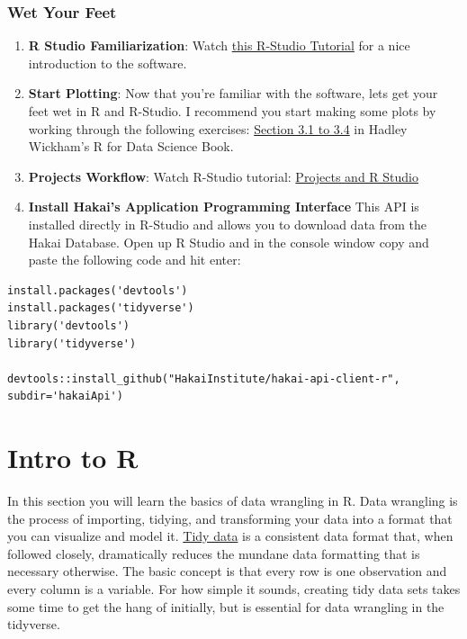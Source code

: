 \documentclass[]{book}
\begin{document}
\subsection{Wet Your Feet}\label{wet-your-feet}

\begin{enumerate}
\def\labelenumi{\arabic{enumi})}
\item
  \textbf{R Studio Familiarization}: Watch
  \href{https://www.rstudio.com/resources/webinars/rstudio-essentials-webinar-series-part-1/}{this
  R-Studio Tutorial} for a nice introduction to the software.
\item
  \textbf{Start Plotting}: Now that you're familiar with the software,
  lets get your feet wet in R and R-Studio. I recommend you start making
  some plots by working through the following exercises:
  \href{http://r4ds.had.co.nz/data-visualisation.html}{Section 3.1 to
  3.4} in Hadley Wickham's R for Data Science Book.
\item
  \textbf{Projects Workflow}: Watch R-Studio tutorial:
  \href{https://www.rstudio.com/resources/webinars/rstudio-essentials-webinar-series-managing-change-part-1/}{Projects
  and R Studio}
\item
  \textbf{Install Hakai's Application Programming Interface} This API is
  installed directly in R-Studio and allows you to download data from
  the Hakai Database. Open up R Studio and in the console window copy
  and paste the following code and hit enter:
\end{enumerate}

\begin{verbatim}
install.packages('devtools')
install.packages('tidyverse')
library('devtools')
library('tidyverse')

devtools::install_github("HakaiInstitute/hakai-api-client-r", subdir='hakaiApi')
\end{verbatim}

\chapter{Intro to R}\label{intro-to-r}

In this section you will learn the basics of data wrangling in R. Data
wrangling is the process of importing, tidying, and transforming your
data into a format that you can visualize and model it.
\href{http://vita.had.co.nz/papers/tidy-data.pdf}{Tidy data} is a
consistent data format that, when followed closely, dramatically reduces
the mundane data formatting that is necessary otherwise. The basic
concept is that every row is one observation and every column is a
variable. For how simple it sounds, creating tidy data sets takes some
time to get the hang of initially, but is essential for data wrangling
in the tidyverse.
\end{document}
